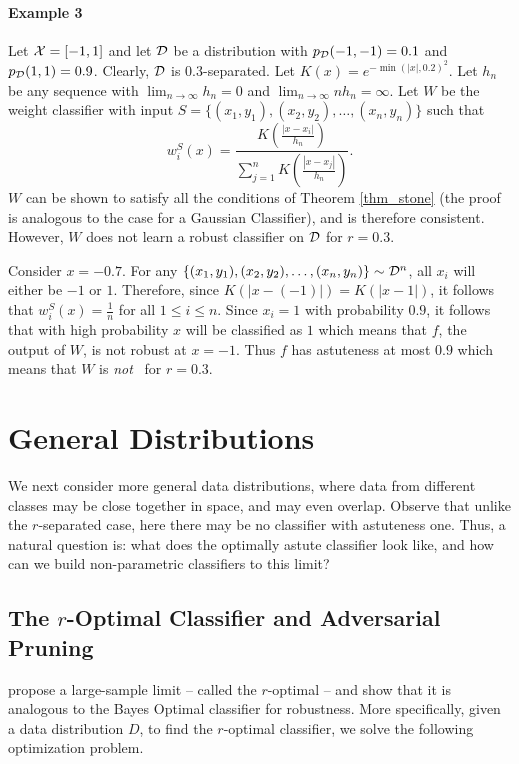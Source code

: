  \paragraph{Example 3} Let $\mathcal X = [-1, 1]$ and let ${\mathcal D}$ be a distribution with $p_{\mathcal D}(-1, -1) = 0.1$ and $p_{\mathcal D}(1, 1) = 0.9$. Clearly, ${\mathcal D}$ is $0.3$-separated. Let $K(x) = e^{-\min(|x|, 0.2)^2}$. Let $h_n$ be any sequence with $\lim_{n \to \infty} h_n = 0$ and $\lim_{n \to \infty} nh_n = \infty$. Let $W$ be the weight classifier with input $S = \{(x_1, y_1), (x_2, y_2), \dots, (x_n, y_n)\}$ such that $$w_i^S(x) = \frac{K(\frac{|x- x_i|}{h_n})}{\sum_{j=1}^n K(\frac{|x-x_j|}{h_n})}.$$ $W$ can be shown to satisfy all the conditions of Theorem \ref{thm_stone} (the proof is analogous to the case for a Gaussian Classifier), and is therefore consistent. However, $W$ does not learn a robust classifier on ${\mathcal D}$ for $r = 0.3$. 

Consider $x = -0.7$. For any $\{(x_1, y_1), (x_2, y_2), \dots, (x_n, y_n)\} \sim {\mathcal D}^n$, all $x_i$ will either be $-1$ or $1$. Therefore, since $K(|x - (-1)|) = K(|x - 1|)$, it follows that $w_i^S(x) = \frac{1}{n}$ for all $1 \leq i \leq n$. Since $x_i = 1$ with probability $0.9$, it follows that with high probability $x$ will be classified as $1$ which means that $f$, the output of $W$, is not robust at $x = -1$. Thus $f$ has astuteness at most $0.9$ which means that $W$ is \textit{not} \rcons\ for $r=0.3$. 

\section{General Distributions}\label{sec:general}


We next consider more general data distributions, where data from different classes may be close together in space, and may even overlap. Observe that unlike the $r$-separated case, here there may be no classifier with astuteness one. Thus, a natural question is: what does the optimally astute classifier look like, and how can we build non-parametric classifiers to this limit?

\subsection{The $r$-Optimal Classifier and Adversarial Pruning}

\cite{YRWC19} propose a large-sample limit -- called the $r$-optimal -- and show that it is analogous to the Bayes Optimal classifier for robustness. More specifically, given a data distribution $D$, to find the $r$-optimal classifier, we solve the following optimization problem.  

